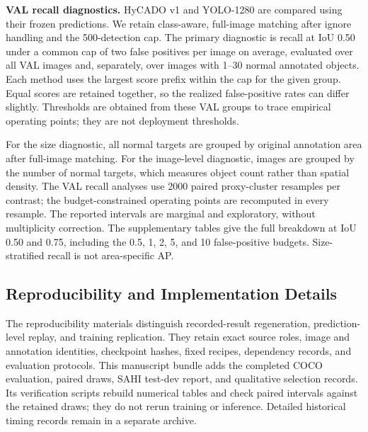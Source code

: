 \documentclass[journal]{IEEEtran}
\begin{document}
\textbf{VAL recall diagnostics.} HyCADO v1 and YOLO-1280 are compared using their frozen predictions. We retain class-aware, full-image matching after ignore handling and the 500-detection cap. The primary diagnostic is recall at IoU 0.50 under a common cap of two false positives per image on average, evaluated over all VAL images and, separately, over images with 1--30 normal annotated objects. Each method uses the largest score prefix within the cap for the given group. Equal scores are retained together, so the realized false-positive rates can differ slightly. Thresholds are obtained from these VAL groups to trace empirical operating points; they are not deployment thresholds.

For the size diagnostic, all normal targets are grouped by original annotation area after full-image matching. For the image-level diagnostic, images are grouped by the number of normal targets, which measures object count rather than spatial density. The VAL recall analyses use 2000 paired proxy-cluster resamples per contrast; the budget-constrained operating points are recomputed in every resample. The reported intervals are marginal and exploratory, without multiplicity correction. The supplementary tables give the full breakdown at IoU 0.50 and 0.75, including the 0.5, 1, 2, 5, and 10 false-positive budgets. Size-stratified recall is not area-specific AP.

\subsection{Reproducibility and Implementation Details}
The reproducibility materials distinguish recorded-result regeneration, prediction-level replay, and training replication. They retain exact source roles, image and annotation identities, checkpoint hashes, fixed recipes, dependency records, and evaluation protocols. This manuscript bundle adds the completed COCO evaluation, paired draws, SAHI test-dev report, and qualitative selection records. Its verification scripts rebuild numerical tables and check paired intervals against the retained draws; they do not rerun training or inference. Detailed historical timing records remain in a separate archive.
\end{document}
